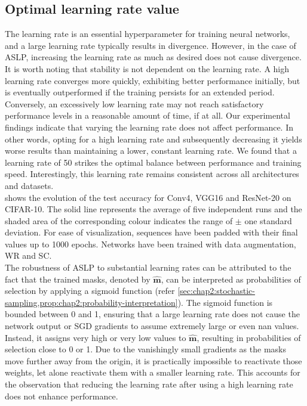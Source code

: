 \subsection{Optimal learning rate value}
\label{sec:chap2:impact_learning_rate}
The learning rate is an essential hyperparameter for training neural networks,
and a large learning rate typically results in divergence. However, in the case
of ASLP, increasing the learning rate as much as desired does not cause
divergence. It is worth noting that stability is not dependent on the learning
rate. A high learning rate converges more quickly, exhibiting better performance
initially, but is eventually outperformed if the training persists for an
extended period. Conversely, an excessively low learning rate may not reach
satisfactory performance levels in a reasonable amount of time, if at all. Our
experimental findings indicate that varying the learning rate does not affect
performance. In other words, opting for a high learning rate and subsequently
decreasing it yields worse results than maintaining a lower, constant learning
rate. We found that a learning rate of 50 strikes the optimal balance between
performance and training speed. Interestingly, this learning rate remains
consistent across all architectures and datasets.\\

 shows the evolution of the test accuracy for Conv4,
VGG16 and ResNet-20 on CIFAR-10. The solid line represents the average of five
independent runs and the shaded area of the corresponding colour indicates the
range of $\pm$ one standard deviation. For ease of visualization, sequences have
been padded with their final values up to 1000 epochs. Networks have been
trained with data augmentation, \ac{WR} and \ac{SC}.\\

The robustness of ASLP to substantial learning rates can be attributed to the
fact that the trained masks, denoted by $\bm{\hat{m}}$, can be interpreted as
probabilities of selection by applying a sigmoid function (refer
\cref{sec:chap2:stochastic-sampling,prop:chap2:probability-interpretation}). The
sigmoid function is bounded between 0 and 1, ensuring that a large learning rate
does not cause the network output or \ac{SGD} gradients
to assume extremely large or even \ac{nan} values. Instead, it assigns very high or
very low values to $\bm{\hat{m}}$, resulting in probabilities of selection close
to 0 or 1. Due to the vanishingly small gradients as the masks move further away
from the origin, it is practically impossible to reactivate those weights, let
alone reactivate them with a smaller learning rate. This accounts for the
observation that reducing the learning rate after using a high learning rate
does not enhance performance.\\

